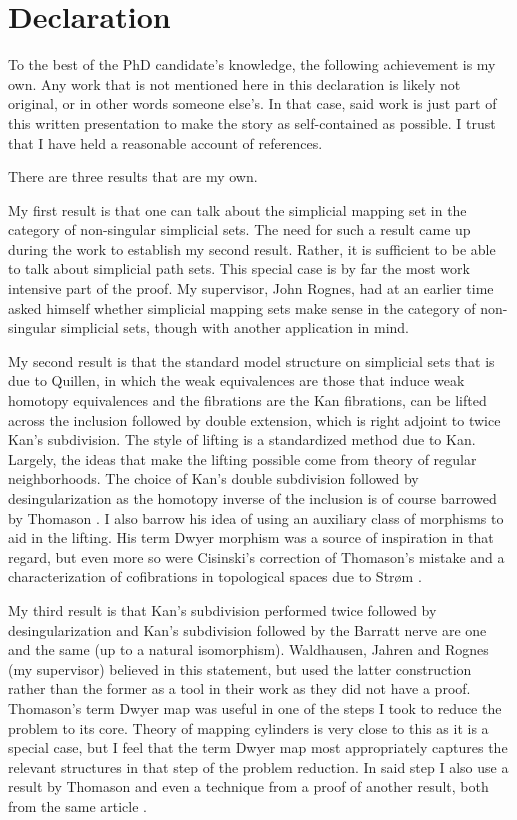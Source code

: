 \chapter{Declaration}

\noindent
To the best of the PhD candidate's knowledge, the following achievement is my own. Any work that is not mentioned here in this declaration is likely not original, or in other words someone else's. In that case, said work is just part of this written presentation to make the story as self-contained as possible. I trust that I have held a reasonable account of references.

There are three results that are my own.

My first result is that one can talk about the simplicial mapping set in the category of non-singular simplicial sets. The need for such a result came up during the work to establish my second result. Rather, it is sufficient to be able to talk about simplicial path sets. This special case is by far the most work intensive part of the proof. My supervisor, John Rognes, had at an earlier time asked himself whether simplicial mapping sets make sense in the category of non-singular simplicial sets, though with another application in mind.

My second result is that the standard model structure on simplicial sets that is due to Quillen, in which the weak equivalences are those that induce weak homotopy equivalences and the fibrations are the Kan fibrations, can be lifted across the inclusion followed by double extension, which is right adjoint to twice Kan's subdivision. The style of lifting is a standardized method due to Kan. Largely, the ideas that make the lifting possible come from theory of regular neighborhoods. The choice of Kan's double subdivision followed by desingularization as the homotopy inverse of the inclusion is of course barrowed by Thomason \cite{Th80}. I also barrow his idea of using an auxiliary class of morphisms to aid in the lifting. His term Dwyer morphism was a source of inspiration in that regard, but even more so were Cisinski's correction \cite{Ci99} of Thomason's mistake and a characterization of cofibrations in topological spaces due to Strøm \cite{St66}.

My third result is that Kan's subdivision performed twice followed by desingularization and Kan's subdivision followed by the Barratt nerve are one and the same (up to a natural isomorphism). Waldhausen, Jahren and Rognes (my supervisor) believed in this statement, but used the latter construction rather than the former as a tool in their work \cite{WJR13} as they did not have a proof. Thomason's term Dwyer map \cite{Th80} was useful in one of the steps I took to reduce the problem to its core. Theory of mapping cylinders is very close to this as it is a special case, but I feel that the term Dwyer map most appropriately captures the relevant structures in that step of the problem reduction. In said step I also use a result by Thomason and even a technique from a proof of another result, both from the same article \cite{Th80}.


